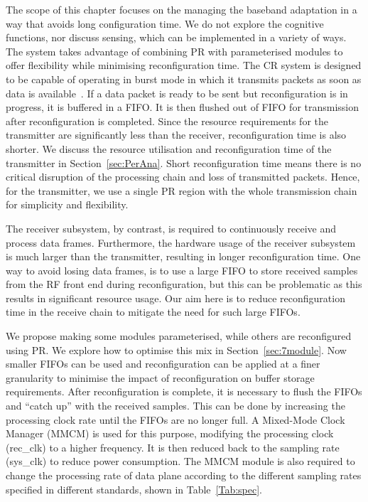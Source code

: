 The scope of this chapter focuses on the managing the baseband adaptation in a way that avoids long configuration time.
We do not explore the cognitive functions, nor discuss sensing, which can be implemented in a variety of ways.
The system takes advantage of combining PR with parameterised modules to offer flexibility while minimising reconfiguration time.
The CR system is designed to be capable of operating in burst mode in which it transmits packets as soon as data is available~\cite{Ai2006}.
If a data packet is ready to be sent but reconfiguration is in progress, it is buffered in a FIFO.
It is then flushed out of FIFO for transmission after reconfiguration is completed.
Since the resource requirements for the transmitter are significantly less than the receiver, reconfiguration time is also shorter.
We discuss the resource utilisation and reconfiguration time of the transmitter in Section~\ref{sec:PerAna}.
Short reconfiguration time means there is no critical disruption of the processing chain and loss of transmitted packets.
Hence, for the transmitter, we use a single PR region with the whole transmission chain for simplicity and flexibility.

The receiver subsystem, by contrast, is required to continuously receive and process data frames.
Furthermore, the hardware usage of the receiver subsystem is much larger than the transmitter, resulting in longer reconfiguration time.
One way to avoid losing data frames, is to use a large FIFO to store received samples from the RF front end during reconfiguration, but this can be problematic as this results in significant resource usage.
Our aim here is to reduce reconfiguration time in the receive chain to mitigate the need for such large FIFOs.

We propose making some modules parameterised, while others are reconfigured using PR.
We explore how to optimise this mix in Section~\ref{sec:7module}.
Now smaller FIFOs can be used and reconfiguration can be applied at a finer granularity to minimise the impact of reconfiguration on buffer storage requirements.
After reconfiguration is complete, it is necessary to flush the FIFOs and ``catch up'' with the received samples.
This can be done by increasing the processing clock rate until the FIFOs are no longer full.
A Mixed-Mode Clock Manager (MMCM) is used for this purpose, modifying the processing clock (rec\_clk) to a higher frequency.
It is then reduced back to the sampling rate (sys\_clk) to reduce power consumption.
The MMCM module is also required to change the processing rate of data plane according to the different sampling rates specified in different standards, shown in Table~\ref{Tab:spec}.

